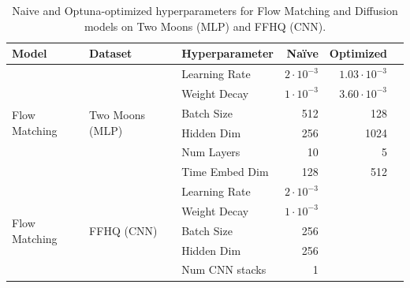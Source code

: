 \documentclass{article}
\begin{document}
\begin{table}[H]
	\centering
	\caption{Naive and Optuna-optimized hyperparameters for Flow Matching and Diffusion models on Two Moons (MLP) and FFHQ (CNN).}
	\label{tab:results}
	\begin{tabular}{lllrrr}
		\toprule
		\textbf{Model}                 & \textbf{Dataset}                 & \textbf{Hyperparameter} & \textbf{Naïve}     & \textbf{Optimized}  \\
		\midrule
		\multirow{6}{*}{Flow Matching} & \multirow{6}{*}{Two Moons (MLP)}
		                               & Learning Rate                    & $2\cdot10^{-3}$         & $1.03\cdot10^{-3}$                       \\
		                               &                                  & Weight Decay            & $1 \cdot 10^{-3}$  & $3.60\cdot 10^{-3}$ \\
		                               &                                  & Batch Size              & 512                & 128                 \\
		                               &                                  & Hidden Dim              & 256                & 1024                \\
		                               &                                  & Num Layers              & 10                 & 5                   \\
		                               &                                  & Time Embed Dim          & 128                & 512                 \\
		\midrule
		\multirow{6}{*}{Flow Matching} & \multirow{6}{*}{FFHQ (CNN)}
		                               & Learning Rate                    & $2\cdot10^{-3}$         &                                          \\
		                               &                                  & Weight Decay            & $1\cdot10^{-3}$    &                     \\
		                               &                                  & Batch Size              & 256                &                     \\
		                               &                                  & Hidden Dim              & 256                &                     \\
		                               &                                  & Num CNN stacks          & 1                  &                     \\

\end{tabular}
\end{table}
\end{document}
